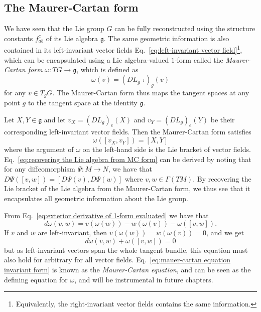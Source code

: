 \subsection{The Maurer-Cartan form} \label{sec:The Maurer-Cartan form}

We have seen that the Lie group $G$ can be fully reconstructed using the structure constants $f_{ab}^c$ of its Lie algebra $\mathfrak{g}$. The same geometric information is also contained in its left-invariant vector fields Eq.~\ref{eq:left-invariant vector field}\footnote{Equivalently, the right-invariant vector fields contains the same information.}, which can be encapsulated using a Lie algebra-valued $1$-form called the \textit{Maurer-Cartan form} $\omega : TG \to \mathfrak{g}$, which is defined as
\begin{equation} \label{eq:Maurer-Cartan form}
\omega(v) = (DL_{g^{-1}})_g (v)
\end{equation}
for any $v \in T_g G$. The Maurer-Cartan form thus maps the tangent spaces at any point $g$ to the tangent space at the identity $\mathfrak{g}$.

Let $X, Y \in \mathfrak{g}$ and let $v_X = (DL_g)_e(X)$ and $v_Y = (DL_g)_e(Y)$ be their corresponding left-invariant vector fields. Then the Maurer-Cartan form satisfies
\begin{equation} \label{eq:recovering the Lie algebra from MC form}
\omega([v_X, v_Y]) = [X, Y]
\end{equation}
where the argument of $\omega$ on the left-hand side is the Lie bracket of vector fields. Eq.~\ref{eq:recovering the Lie algebra from MC form} can be derived by noting that for any diffeomorphism $\Psi : M \to N$, we have that $D\Psi([v,w]) = [D\Psi(v), D\Psi(w)]$ where $v,w \in \Gamma(TM)$. By recovering the Lie bracket of the Lie algebra from the Maurer-Cartan form, we thus see that it encapsulates all geometric information about the Lie group.

From Eq.~\ref{eq:exterior derivative of 1-form evaluated} we have that
\begin{equation}
d \omega(v,w) = v(\omega(w)) - w(\omega(v)) - \omega([v,w]).
\end{equation}
If $v$ and $w$ are left-invariant, then $v(\omega(w)) = w(\omega(v)) = 0$, and we get
\begin{equation} \label{eq:mauer-cartan equation invariant form}
d \omega(v,w) + \omega([v,w]) = 0
\end{equation}
but as left-invariant vectors span the whole tangent bundle, this equation must also hold for arbitrary for all vector fields. Eq.~\ref{eq:mauer-cartan equation invariant form} is known as the \textit{Maurer-Cartan equation}, and can be seen as the defining equation for $\omega$, and will be instrumental in future chapters.

